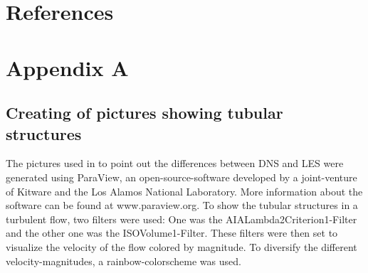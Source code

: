 \documentclass[11pt,a4paper,openany,oneside,parskip=half*]{article}
\begin{document}
\section{References}
\vspace*{-1.2cm}
\nocite{*} %
\pagebreak
\section{Appendix A}
\subsection*{Creating of pictures showing tubular structures}
The pictures used in to point out the differences between DNS and LES were generated using ParaView, an open-source-software developed by a joint-venture of Kitware and the Los Alamos National Laboratory. More information about the software can be found at www.paraview.org. To show the tubular structures in a turbulent flow, two filters were used: One was the AIALambda2Criterion1-Filter and the other one was the ISOVolume1-Filter. These filters were then set to visualize the velocity of the flow colored by magnitude. To diversify the different velocity-magnitudes, a rainbow-colorscheme was used. 
\end{document}
